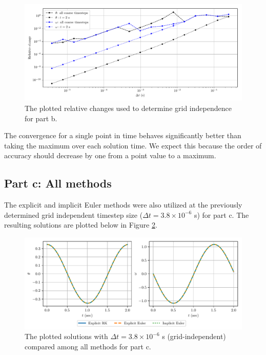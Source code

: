 \documentclass{article}
\begin{document}
\begin{figure}[H]
	\centering
	\includegraphics[width=\linewidth]{b}
	\caption{The plotted relative changes used to determine grid independence for part b.}
	\label{fig:b}
\end{figure}

The convergence for a single point in time behaves significantly better than taking the maximum over each solution time. We expect this because the order of accuracy should decrease by one from a point value to a maximum.

\subsection*{Part c: All methods}

The explicit and implicit Euler methods were also utilized at the previously determined grid independent timestep size ($\Delta t = 3.8\times10^{-6}$ s) for part c. The resulting solutions are plotted below in Figure \ref{fig:c}.

\begin{figure}[H]
	\centering
	\includegraphics[width=\linewidth]{c}
	\caption{The plotted solutions with $\Delta t = 3.8\times10^{-6}$ s (grid-independent) compared among all methods for part c.}
	\label{fig:c}
\end{figure}
\end{document}
